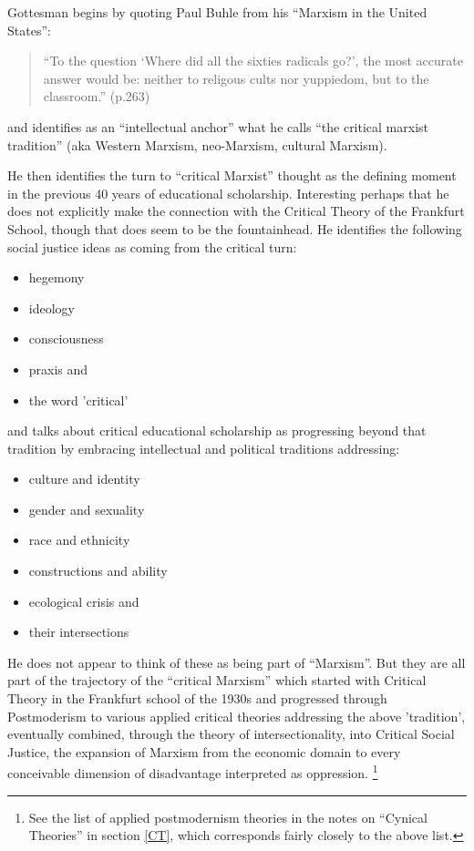 \documentclass[10pt,titlepage]{book}
\begin{document}
Gottesman begins by quoting Paul Buhle from his ``Marxism in the United States''\cite{buhle-histmarx}:

\begin{quotation}
  ``To the question `Where did all the sixties radicals go?', the most accurate answer would be: neither to religous cults nor yuppiedom, but to the classroom.'' (p.263)
  \end{quotation}
and identifies as an ``intellectual anchor'' what he calls ``the critical marxist tradition'' (aka Western Marxism, neo-Marxism, cultural Marxism).

He then identifies the turn to ``critical Marxist'' thought as the defining moment in the previous 40 years of educational scholarship.
Interesting perhaps that he does not explicitly make the connection with the Critical Theory of the Frankfurt School, though that does seem to be the fountainhead.
He identifies the following social justice ideas as coming from the critical turn:

\begin{itemize}
\item hegemony
\item ideology
\item consciousness
\item praxis
  and
  \item the word 'critical'
  \end{itemize}

and talks about critical educational scholarship as progressing beyond that tradition by embracing intellectual and political traditions addressing:

\begin{itemize}
\item culture and identity
\item gender and sexuality
\item race and ethnicity
\item constructions and ability
\item ecological crisis
  and
\item their intersections  
\end{itemize}

He does not appear to think of these as being part of ``Marxism''.
But they are all part of the trajectory of the ``critical Marxism'' which started with Critical Theory in the Frankfurt school of the 1930s and progressed through Postmoderism to various applied critical theories addressing the above 'tradition', eventually combined, through the theory of intersectionality, into Critical Social Justice, the expansion of Marxism from the economic domain to every conceivable dimension of disadvantage interpreted as oppression.%
\footnote{See the list of applied postmodernism theories in the notes on ``Cynical Theories'' in section \ref{CT}, which corresponds fairly closely to the above list.}
\end{document}
